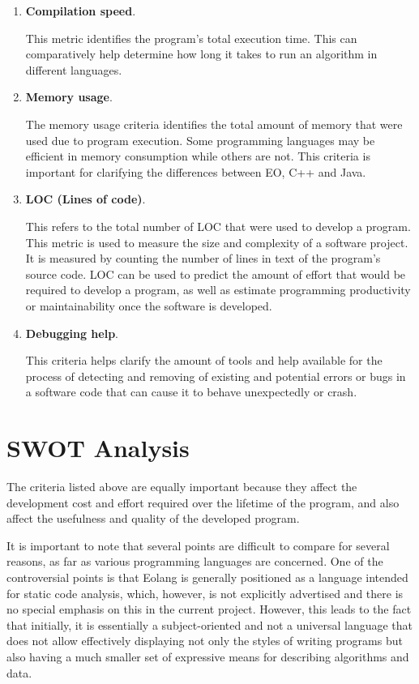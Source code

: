 \documentclass[12pt]{book}
\begin{document}
{{\begin{enumerate}
    \item \textbf{Compilation speed}.

This metric identifies the program's total execution time. This can comparatively help determine how long it takes to run an algorithm in different languages.

    \item \textbf{Memory usage}.

The memory usage criteria identifies the  total amount of memory that were used due to program execution. Some programming languages may be efficient in memory consumption while others are not. This criteria is important for clarifying the differences between EO, C++ and Java.

    \item \textbf{LOC (Lines of code)}.

This refers to the total number of LOC that were used to develop a program. This metric is used to measure the size and complexity of a software project. It is measured by counting the number of lines in text of the program's source code. LOC can be used to predict the amount of effort that would be required to develop a program, as well as estimate programming productivity or maintainability once the software is developed.

    \item \textbf{Debugging help}.

This criteria helps clarify the amount of tools and help available for the process of detecting and removing of existing and potential errors or bugs in a software code that can cause it to behave unexpectedly or crash.
\end{enumerate}

\section{SWOT Analysis}

The criteria listed above are equally important because they affect the development cost and effort required over the lifetime of the program, and also affect the usefulness and quality of the developed program.

It is important to note that several points are difficult to compare for several reasons, as far as various programming languages are concerned. One of the controversial points is that Eolang is generally positioned as a language intended for static code analysis, which, however, is not explicitly advertised and there is no special emphasis on this in the current project. However, this leads to the fact that initially, it is essentially a subject-oriented and not a universal language that does not allow effectively displaying not only the styles of writing programs but also having a much smaller set of expressive means for describing algorithms and data.

}}
\end{document}
